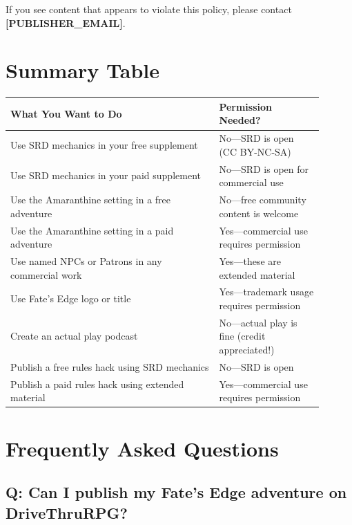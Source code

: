 \documentclass[11pt]{article}
\begin{document}
If you see content that appears to violate this policy, please contact \textbf{[PUBLISHER\_EMAIL]}.

\section*{Summary Table}

\vspace{0.2in}

\begin{center}
  \begin{tabular}{>{\raggedright\arraybackslash}p{0.6\linewidth}>{\raggedright\arraybackslash}p{0.3\linewidth}}
    \toprule
    \textbf{What You Want to Do} & \textbf{Permission Needed?} \\
    \midrule
    Use SRD mechanics in your free supplement & No---SRD is open (CC BY-NC-SA) \\
    Use SRD mechanics in your paid supplement & No---SRD is open for commercial use \\
    Use the Amaranthine setting in a free adventure & No---free community content is welcome \\
    Use the Amaranthine setting in a paid adventure & Yes---commercial use requires permission \\
    Use named NPCs or Patrons in any commercial work & Yes---these are extended material \\
    Use Fate's Edge logo or title & Yes---trademark usage requires permission \\
    Create an actual play podcast & No---actual play is fine (credit appreciated!) \\
    Publish a free rules hack using SRD mechanics & No---SRD is open \\
    Publish a paid rules hack using extended material & Yes---commercial use requires permission \\
    \bottomrule
  \end{tabular}
\end{center}

\section*{Frequently Asked Questions}

\subsection*{Q: Can I publish my Fate's Edge adventure on DriveThruRPG?}
\end{document}
